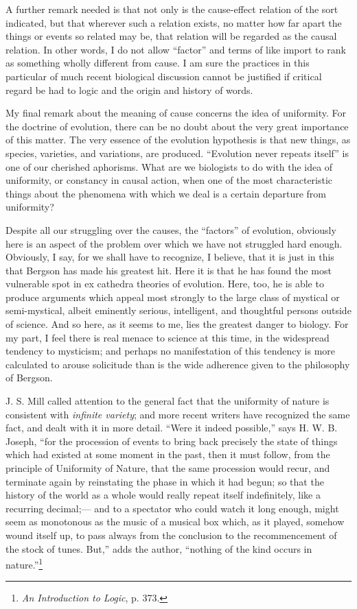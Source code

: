 \documentclass[a4paper, 11pt, oneside, polutonikogreek, english]{article}
\begin{document}
A further remark needed is that not only is the cause-effect relation of the sort indicated, but that wherever such a relation exists, no matter how far apart the things or events so related may be, that relation will be regarded as the causal relation. In other words, I do not allow ``factor'' and terms of like import to rank as something wholly different from cause. I am sure the practices in this particular of much recent biological discussion cannot be justified if critical regard be had to logic and the origin and history of words.

My final remark about the meaning of cause concerns the idea of uniformity. For the doctrine of evolution, there can be no doubt about the very great importance of this matter. The very essence of the evolution hypothesis is that new things, as species, varieties, and variations, are produced. ``Evolution never repeats itself'' is one of our cherished aphorisms. What are we biologists to do with the idea of uniformity, or constancy in causal action, when one of the most characteristic things about the phenomena with which we deal is a certain departure from uniformity?

Despite all our struggling over the causes, the ``factors'' of evolution, obviously here is an aspect of the problem over which we have not struggled hard enough. Obviously, I say, for we shall have to recognize, I believe, that it is just in this that Bergson has made his greatest hit. Here it is that he has found the most vulnerable spot in ex cathedra theories of evolution. Here, too, he is able to produce arguments which appeal most strongly to the large class of mystical or semi-mystical, albeit eminently serious, intelligent, and thoughtful persons outside of science. And so here, as it seems to me, lies the greatest danger to biology. For my part, I feel there is real menace to science at this time, in the widespread tendency to mysticism; and perhaps no manifestation of this tendency is more calculated to arouse solicitude than is the wide adherence given to the philosophy of Bergson.

J. S. Mill called attention to the general fact that the uniformity of nature is consistent with \emph{infinite variety}; and more recent writers have recognized the same fact, and dealt with it in more detail. ``Were it indeed possible,'' says H. W. B. Joseph, ``for the procession of events to bring back precisely the state of things which had existed at some moment in the past, then it must follow, from the principle of Uniformity of Nature, that the same procession would recur, and terminate again by reinstating the phase in which it had begun; so that the history of the world as a whole would really repeat itself indefinitely, like a recurring decimal;--- and to a spectator who could watch it long enough, might seem as monotonous as the music of a musical box which, as it played, somehow wound itself up, to pass always from the conclusion to the recommencement of the stock of tunes. But,'' adds the author, ``nothing of the kind occurs in nature.''\footnote{\emph{An Introduction to Logic}, p. 373.}
\end{document}
